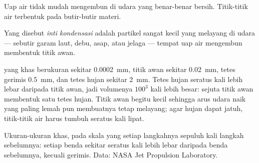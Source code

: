 Uap air tidak mudah mengembun di udara yang benar-benar bersih. Titik-titik
air terbentuk pada butir-butir materi.

\begin{definition}\label{def:g10:why-clouds-form:nucleus}
Yang disebut \emph{inti kondensasi} adalah partikel
sangat kecil yang melayang di udara --- sebutir garam laut, debu, asap, atau
jelaga --- tempat uap air mengembun membentuk titik awan.
\end{definition}

 yang khas berukuran sekitar \qty{0.0002}{mm}, titik awan
sekitar \qty{0.02}{mm}, tetes gerimis \qty{0.5}{mm}, dan tetes hujan sekitar
\qty{2}{mm}. Tetes hujan seratus kali lebih lebar daripada titik awan, jadi
volumenya $100^3$ kali lebih besar: sejuta titik awan membentuk satu tetes
hujan. Titik awan begitu kecil sehingga arus udara naik yang paling lemah pun
membuatnya tetap melayang; agar hujan dapat jatuh, titik-titik air harus
tumbuh seratus kali lipat.

\begin{omfigure}

{\small Ukuran-ukuran khas, pada skala yang setiap langkahnya sepuluh kali
langkah sebelumnya: setiap benda sekitar seratus kali lebih lebar daripada
benda sebelumnya, kecuali gerimis. Data: NASA Jet Propulsion Laboratory.}
\end{omfigure}

